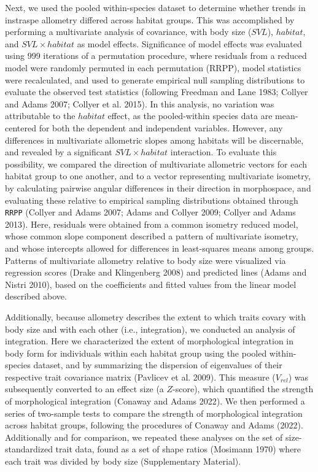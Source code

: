\documentclass[
  11pt,
]{article}
\begin{document}
Next, we used the pooled within-species dataset to determine whether
trends in instraspe allometry differed across habitat groups. This was
accomplished by performing a multivariate analysis of covariance, with
body size (\(SVL\)), \(habitat\), and \(SVL \times habitat\) as model
effects. Significance of model effects was evaluated using 999
iterations of a permutation procedure, where residuals from a reduced
model were randomly permuted in each permutation (RRPP), model
statistics were recalculated, and used to generate empirical null
sampling distributions to evaluate the observed test statistics
(following Freedman and Lane 1983; Collyer and Adams 2007; Collyer et
al. 2015). In this analysis, no variation was attributable to the
\(habitat\) effect, as the pooled-within species data are mean-centered
for both the dependent and independent variables. However, any
differences in multivariate allometric slopes among habitats will be
discernable, and revealed by a significant \(SVL \times habitat\)
interaction. To evaluate this possibility, we compared the direction of
multivariate allometric vectors for each habitat group to one another,
and to a vector representing multivariate isometry, by calculating
pairwise angular differences in their direction in morphospace, and
evaluating these relative to empirical sampling distributions obtained
through \texttt{RRPP} (Collyer and Adams 2007; Adams and Collyer 2009;
Collyer and Adams 2013). Here, residuals were obtained from a common
isometry reduced model, whose common slope component described a pattern
of multivariate isometry, and whose intercepts allowed for differences
in least-squares means among groups. Patterns of multivariate allometry
relative to body size were visualized via regression scores (Drake and
Klingenberg 2008) and predicted lines (Adams and Nistri 2010), based on
the coefficients and fitted values from the linear model described
above. \hfill\break

Additionally, because allometry describes the extent to which traits
covary with body size and with each other (i.e., integration), we
conducted an analysis of integration. Here we characterized the extent
of morphological integration in body form for individuals within each
habitat group using the pooled within-species dataset, and by
summarizing the dispersion of eigenvalues of their respective trait
covariance matrix (Pavlicev et al. 2009). This measure (\(V_{rel}\)) was
subsequently converted to an effect size (a \(Z\)-score), which
quantified the strength of morphological integration (Conaway and Adams
2022). We then performed a series of two-sample tests to compare the
strength of morphological integration across habitat groups, following
the procedures of Conaway and Adams (2022). Additionally and for
comparison, we repeated these analyses on the set of size-standardized
trait data, found as a set of shape ratios (Mosimann 1970) where each
trait was divided by body size (Supplementary Material). \hfill\break
\end{document}
